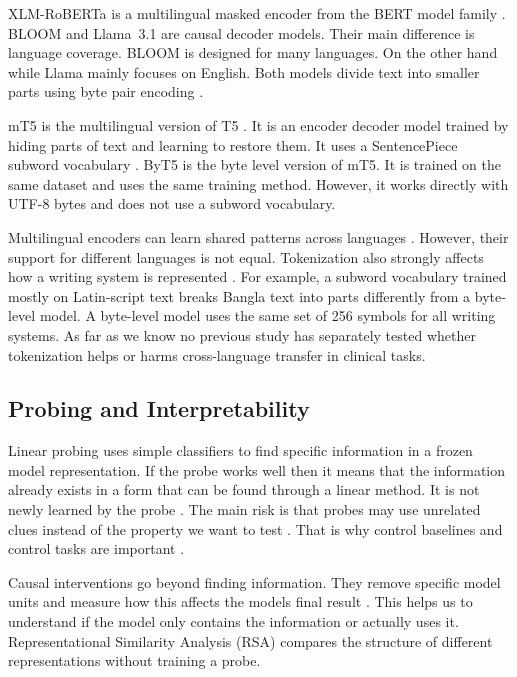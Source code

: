 \documentclass[preprint,12pt]{elsarticle}
\begin{document}
XLM-RoBERTa \cite{conneau2020xlmr} is a multilingual masked encoder from the BERT model family \cite{devlin2019bert}. BLOOM \cite{scao2022bloom} and Llama~3.1 \cite{dubey2024llama3} are causal decoder models. Their main difference is language coverage. BLOOM is designed for many languages. On the other hand while Llama mainly focuses on English. Both models divide text into smaller parts using byte pair encoding \cite{sennrich2016bpe}.

mT5 \cite{xue2021mt5} is the multilingual version of T5 \cite{raffel2020t5}. It is an encoder decoder model trained by hiding parts of text and learning to restore them. It uses a SentencePiece subword vocabulary \cite{kudo2018sentencepiece}. ByT5 \cite{xue2022byt5} is the byte level version of mT5. It is trained on the same dataset and uses the same training method. However, it works directly with UTF-8 bytes and does not use a subword vocabulary.

Multilingual encoders can learn shared patterns across languages \cite{pires2019mbert,wu2020emerging,artetxe2020cross}. However, their support for different languages is not equal. Tokenization also strongly affects how a writing system is represented \cite{rust2021tokenizer}. For example, a subword vocabulary trained mostly on Latin-script text breaks Bangla text into parts differently from a byte-level model. A byte-level model uses the same set of 256 symbols for all writing systems. As far as we know no previous study has separately tested whether tokenization helps or harms cross-language transfer in clinical tasks.

\subsection{Probing and Interpretability}
Linear probing uses simple classifiers to find specific information in a frozen model representation. If the probe works well then it means that the information already exists in a form that can be found through a linear method. It is not newly learned by the probe \cite{alain2017probes,conneau2018probing,hewitt2019structural,belinkov2022probing}.
The main risk is that probes may use unrelated clues instead of the property we want to test \cite{belinkov2022probing,pimentel2020information}. That is why control baselines and control tasks are important \cite{hewitt2019control}.

Causal interventions go beyond finding information. They remove specific model units and measure how this affects the models final result \cite{vig2020causal,meng2022rome}. This helps us to understand if the model only contains the information or actually uses it. Representational Similarity Analysis (RSA) \cite{kriegeskorte2008rsa} compares the structure of different representations without training a probe.
\end{document}
